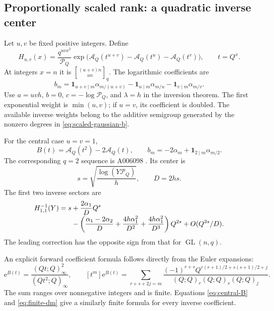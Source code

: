 \documentclass[11pt]{article}
\numberwithin{equation}{section}
\theoremstyle{definition}
\newcommand{\GL}{\operatorname{GL}}
\newcommand{\qbin}[2]{\genfrac{[}{]}{0pt}{}{#1}{#2}_{q}}
\newcommand{\pp}[1]{(Q;Q)_{#1}}
\newcommand{\Pinf}{\mathcal P_Q}
\newcommand{\A}{\mathcal A_Q}
\newcommand{\ee}{\mathrm e}
\newcommand{\one}{\mathbf 1}
\begin{document}
\subsection{Proportionally scaled rank: a quadratic inverse center}

Let $u,v$ be fixed positive integers. Define
\begin{equation}\label{eq:scaled-gaussian}
 H_{u,v}(x)=\frac{q^{uvx^2}}{\Pinf}
 \exp\bigl(\A(t^{u+v})-\A(t^u)-\A(t^v)\bigr),
 \qquad t=Q^x.
\end{equation}
At integers $x=n$ it is $\qbin{(u+v)n}{un}$. The logarithmic coefficients are
\begin{equation}\label{eq:scaled-gaussian-b}
 b_m=\one_{u+v\mid m}\alpha_{m/(u+v)}
     -\one_{u\mid m}\alpha_{m/u}
     -\one_{v\mid m}\alpha_{m/v}.
\end{equation}
Use $a=uvh$, $b=0$, $c=-\log\Pinf$, and $\lambda=h$ in the inversion theorem. The first exponential weight is $\min(u,v)$; if $u=v$, its coefficient is doubled. The available inverse weights belong to the additive semigroup generated by the nonzero degrees in \eqref{eq:scaled-gaussian-b}.

For the central case $u=v=1$,
\begin{equation}\label{eq:central-B}
 B(t)=\A(t^2)-2\A(t),\qquad
 b_m=-2\alpha_m+\one_{2\mid m}\alpha_{m/2}.
\end{equation}
The corresponding $q=2$ sequence is A006098 \cite{oeiscentral}. Its center is
\begin{equation}\label{eq:central-center}
 s=\sqrt{\frac{\log(Y\Pinf)}h},\qquad D=2hs.
\end{equation}
The first two inverse sectors are
\begin{align}\label{eq:central-inverse}
 H_{1,1}^{-1}(Y)=s
 &+\frac{2\alpha_1}{D}Q^s\\[-0.3em]
 &-\left(\frac{\alpha_1-2\alpha_2}{D}
       +\frac{4h\alpha_1^2}{D^2}
       +\frac{4h\alpha_1^2}{D^3}\right)Q^{2s}
 +O(Q^{3s}/D).\notag
\end{align}
The leading correction has the opposite sign from that for $\GL(n,q)$.

An explicit forward coefficient formula follows directly from the Euler expansions:
\begin{equation}\label{eq:central-forward}
 \ee^{B(t)}=\frac{(Qt;Q)_\infty^2}{(Qt^2;Q)_\infty},\qquad
 [t^m]\ee^{B(t)}=
 \sum_{r+s+2j=m}
 \frac{(-1)^{r+s}Q^{r(r+1)/2+s(s+1)/2+j}}
 {\pp{r}\pp{s}\pp{j}}.
\end{equation}
The sum ranges over nonnegative integers and is finite. Equations \eqref{eq:central-B} and \eqref{eq:finite-dm} give a similarly finite formula for every inverse coefficient.
\end{document}
